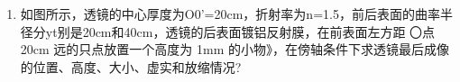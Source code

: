 
\begin{enumerate}
\item 如图所示，透镜的中心厚度为O0'=20cm，折射率为n=1.5，前后表面的曲率半径分yt别是20cm和40cm，透镜的后表面镀铝反射膜，在前表面左方距 〇点 20cm 远的只点放置一个高度为 1mm 的小物》，在傍轴条件下求透镜最后成像的位置、高度、大小、虚实和放缩情况?
\end{enumerate}